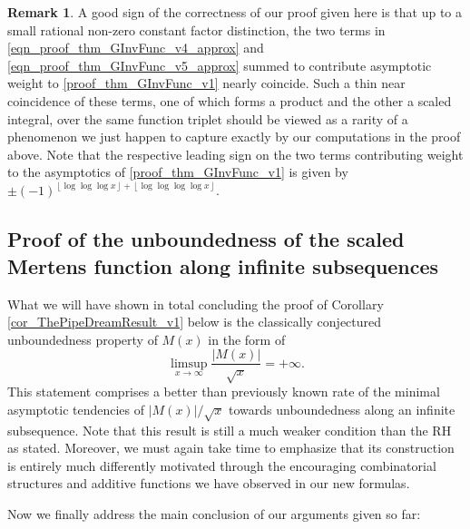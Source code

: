 \documentclass[11pt,reqno,a4letter]{article}
\numberwithin{figure}{section}
\numberwithin{table}{section}
\newcommand{\floor}[1]{\left\lfloor #1 \right\rfloor}
\theoremstyle{plain}
\numberwithin{theorem}{section}
\theoremstyle{definition}
\newtheorem{remark}[theorem]{Remark}
\begin{document}
\begin{remark} 
A good sign of the correctness of our proof given here is that up to a small rational non-zero 
constant factor distinction, the two terms in 
\eqref{eqn_proof_thm_GInvFunc_v4_approx} and \eqref{eqn_proof_thm_GInvFunc_v5_approx} 
summed to contribute asymptotic weight to 
\eqref{proof_thm_GInvFunc_v1} nearly coincide. 
Such a thin near coincidence of these terms, one of which forms a product and the other a 
scaled integral, over the same function triplet should be viewed as a rarity of a  
phenomenon we just happen to capture exactly by our computations in the proof above. 
Note that the respective leading 
sign on the two terms contributing weight to the asymptotics of 
\eqref{proof_thm_GInvFunc_v1} is given by 
$\pm (-1)^{\floor{\log\log\log x} + \floor{\log\log\log\log x}}$. 
\end{remark} 

\subsection{Proof of the unboundedness of the scaled Mertens function along infinite subsequences}
\label{subSection_TheCoreResultProof} 

What we will have shown in total concluding the proof of 
Corollary \ref{cor_ThePipeDreamResult_v1} below is the classically conjectured 
unboundedness property of $M(x)$ in the form of 
\[
\limsup_{x \rightarrow \infty} \frac{|M(x)|}{\sqrt{x}} = +\infty. 
\]
This statement comprises a better than previously known rate of the minimal asymptotic tendencies of 
$|M(x)| / \sqrt{x}$ towards unboundedness along an infinite subsequence. 
Note that this result is still a much weaker condition than the RH as stated. Moreover, 
we must again take time to emphasize that its construction is entirely much differently 
motivated through the encouraging combinatorial structures and additive functions 
we have observed in our new formulas. 

Now we finally address the main conclusion of our arguments given so far: 
\end{document}
